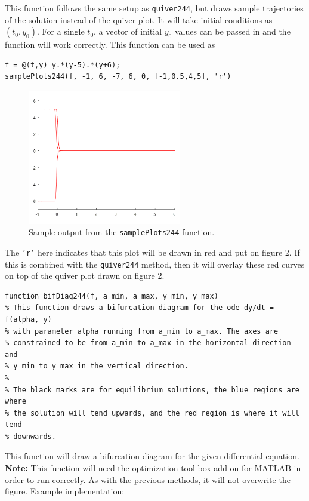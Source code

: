 \documentclass{ximera}
\begin{document}
This function follows the same setup as \texttt{quiver244}, but draws sample trajectories of the solution instead of the quiver plot. It will take initial conditions as $(t_0, y_0)$. For a single $t_0$, a vector of initial $y_0$ values can be passed in and the function will work correctly. This function can be used as
\begin{verbatim}
f = @(t,y) y.*(y-5).*(y+6);
samplePlots244(f, -1, 6, -7, 6, 0, [-1,0.5,4,5], 'r') 
\end{verbatim}

\begin{figure}[h!]
    \centering
    \includegraphics[width=0.6\textwidth]{figures/MatlabDemo_samplePlots.png}
    \caption{Sample output from the \texttt{samplePlots244} function.}
    \label{fig:MatlabDemo_SamplePlots}
\end{figure}

The \texttt{`r'} here indicates that this plot will be drawn in red and put on figure 2. If this is combined with the \texttt{quiver244} method, then it will overlay these red curves on top of the quiver plot drawn on figure 2. 

\begin{verbatim}
function bifDiag244(f, a_min, a_max, y_min, y_max)
% This function draws a bifurcation diagram for the ode dy/dt = f(alpha, y)
% with parameter alpha running from a_min to a_max. The axes are
% constrained to be from a_min to a_max in the horizontal direction and
% y_min to y_max in the vertical direction.
%
% The black marks are for equilibrium solutions, the blue regions are where
% the solution will tend upwards, and the red region is where it will tend
% downwards.
\end{verbatim}

This function will draw a bifurcation diagram for the given differential equation. \textbf{Note:} This function will need the optimization tool-box add-on for MATLAB in order to run correctly. As with the previous methods, it will not overwrite the figure. Example implementation:
\end{document}
